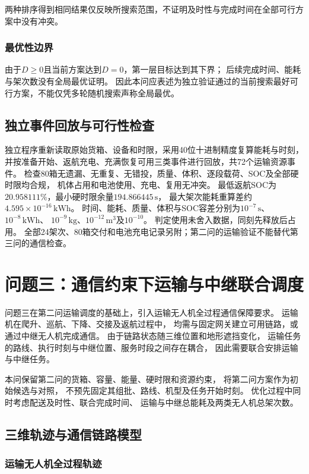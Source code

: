 \documentclass[bwprint]{gmcmthesis}
\begin{document}
两种排序得到相同结果仅反映所搜索范围，不证明及时性与完成时间在全部可行方案中没有冲突。

\subsubsection{最优性边界}
由于$D\geq0$且当前方案达到$D=0$，第一层目标达到其下界；
后续完成时间、能耗与架次数没有全局最优证明。
因此本问应表述为独立验证通过的当前搜索最好可行方案，不能仅凭多轮随机搜索声称全局最优。

\subsection{独立事件回放与可行性检查}
独立程序重新读取原始货箱、设备和时限，采用40位十进制精度复算能耗与时刻，
并按准备开始、返航充电、充满恢复可用三类事件进行回放，共72个运输资源事件。
检查80箱无遗漏、无重复、无错投，质量、体积、逐段载荷、SOC及全部硬时限均合规，
机体占用和电池使用、充电、复用无冲突。
最低返航SOC为$20.958111\%$，最小硬时限余量$194.866445\,\mathrm{s}$，
最大架次能耗重算差约$4.595\times10^{-16}\,\mathrm{kWh}$。
时间、能耗、质量、体积与SOC容差分别为$10^{-7}\,\mathrm{s}$、$10^{-8}\,\mathrm{kWh}$、
$10^{-9}\,\mathrm{kg}$、$10^{-12}\,\mathrm{m^3}$及$10^{-10}$。
判定使用未舍入数据，同刻先释放后占用。
全部24架次、80箱交付和电池充电记录另附；第二问的运输验证不能替代第三问的通信检查。

\section{问题三：通信约束下运输与中继联合调度}

问题三在第二问运输调度的基础上，引入运输无人机全过程通信保障要求。
运输机在爬升、巡航、下降、交接及返航过程中，
均需与固定网关建立可用链路，或通过中继无人机完成通信。
由于链路状态随三维位置和地形遮挡变化，
运输任务的路线、执行时刻与中继位置、服务时段之间存在耦合，
因此需要联合安排运输与中继任务。

本问保留第二问的货箱、容量、能量、硬时限和资源约束，
将第二问方案作为初始候选与对照，
不预先固定其组批、路线、机型及任务开始时刻。
优化过程中同时考虑配送及时性、联合完成时间、
运输与中继总能耗及两类无人机总架次数。

\subsection{三维轨迹与通信链路模型}

\subsubsection{运输无人机全过程轨迹}
\end{document}
